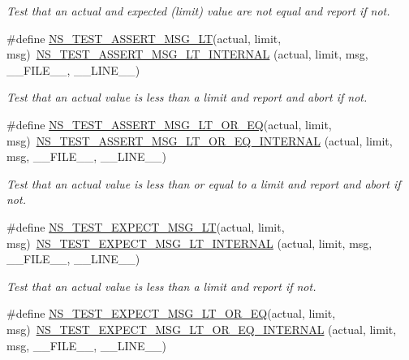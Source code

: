 \begin{DoxyCompactItemize}
\begin{DoxyCompactList}\small\item\em Test that an actual and expected (limit) value are not equal and report if not. \end{DoxyCompactList}\item 
\#define \hyperlink{group__testing_ga1d96848b91407c9a0b36583e8b0ad7ae}{N\+S\+\_\+\+T\+E\+S\+T\+\_\+\+A\+S\+S\+E\+R\+T\+\_\+\+M\+S\+G\+\_\+\+LT}(actual,  limit,  msg)~\hyperlink{group__testingimpl_ga82db873e1b99e6311ba0f9dbff7c758d}{N\+S\+\_\+\+T\+E\+S\+T\+\_\+\+A\+S\+S\+E\+R\+T\+\_\+\+M\+S\+G\+\_\+\+L\+T\+\_\+\+I\+N\+T\+E\+R\+N\+AL} (actual, limit, msg, \+\_\+\+\_\+\+F\+I\+L\+E\+\_\+\+\_\+, \+\_\+\+\_\+\+L\+I\+N\+E\+\_\+\+\_\+)
\begin{DoxyCompactList}\small\item\em Test that an actual value is less than a limit and report and abort if not. \end{DoxyCompactList}\item 
\#define \hyperlink{group__testing_gaa657eabfc1af9c3768dfa2d575eb0549}{N\+S\+\_\+\+T\+E\+S\+T\+\_\+\+A\+S\+S\+E\+R\+T\+\_\+\+M\+S\+G\+\_\+\+L\+T\+\_\+\+O\+R\+\_\+\+EQ}(actual,  limit,  msg)~\hyperlink{group__testingimpl_ga7f276bcecced206bfd26813ac5c9a967}{N\+S\+\_\+\+T\+E\+S\+T\+\_\+\+A\+S\+S\+E\+R\+T\+\_\+\+M\+S\+G\+\_\+\+L\+T\+\_\+\+O\+R\+\_\+\+E\+Q\+\_\+\+I\+N\+T\+E\+R\+N\+AL} (actual, limit, msg, \+\_\+\+\_\+\+F\+I\+L\+E\+\_\+\+\_\+, \+\_\+\+\_\+\+L\+I\+N\+E\+\_\+\+\_\+)
\begin{DoxyCompactList}\small\item\em Test that an actual value is less than or equal to a limit and report and abort if not. \end{DoxyCompactList}\item 
\#define \hyperlink{group__testing_ga5e7f81b9d00df9c727e6281e1b1bbc55}{N\+S\+\_\+\+T\+E\+S\+T\+\_\+\+E\+X\+P\+E\+C\+T\+\_\+\+M\+S\+G\+\_\+\+LT}(actual,  limit,  msg)~\hyperlink{group__testingimpl_ga73d8db2f2a288409abbd267fc31b2e00}{N\+S\+\_\+\+T\+E\+S\+T\+\_\+\+E\+X\+P\+E\+C\+T\+\_\+\+M\+S\+G\+\_\+\+L\+T\+\_\+\+I\+N\+T\+E\+R\+N\+AL} (actual, limit, msg, \+\_\+\+\_\+\+F\+I\+L\+E\+\_\+\+\_\+, \+\_\+\+\_\+\+L\+I\+N\+E\+\_\+\+\_\+)
\begin{DoxyCompactList}\small\item\em Test that an actual value is less than a limit and report if not. \end{DoxyCompactList}\item 
\#define \hyperlink{group__testing_ga5004077a1e04c52548136691e046514b}{N\+S\+\_\+\+T\+E\+S\+T\+\_\+\+E\+X\+P\+E\+C\+T\+\_\+\+M\+S\+G\+\_\+\+L\+T\+\_\+\+O\+R\+\_\+\+EQ}(actual,  limit,  msg)~\hyperlink{group__testingimpl_ga249245c784a56a7dbd704bc1d98b6873}{N\+S\+\_\+\+T\+E\+S\+T\+\_\+\+E\+X\+P\+E\+C\+T\+\_\+\+M\+S\+G\+\_\+\+L\+T\+\_\+\+O\+R\+\_\+\+E\+Q\+\_\+\+I\+N\+T\+E\+R\+N\+AL} (actual, limit, msg, \+\_\+\+\_\+\+F\+I\+L\+E\+\_\+\+\_\+, \+\_\+\+\_\+\+L\+I\+N\+E\+\_\+\+\_\+)

\end{DoxyCompactItemize}
